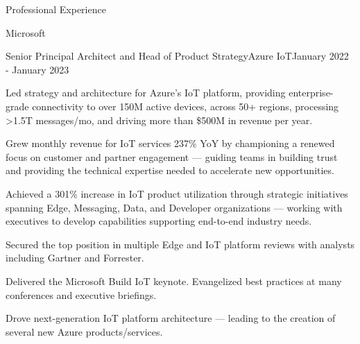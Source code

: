 \documentclass{resume} %
\begin{document}
\begin{rSection}{Professional Experience}
  \begin{rCompany}{Microsoft}{}{}

     \begin{rSubSubsection}{Senior Principal Architect and Head of Product Strategy}{Azure IoT}{January 2022 - January 2023}
        \item Led strategy and architecture for Azure's IoT platform, providing enterprise-grade connectivity to over 150M active devices, across 50+ regions, processing >1.5T messages/mo, and driving more than \$500M in revenue per year.
        \item Grew monthly revenue for IoT services 237\% YoY by championing a renewed focus on customer and partner engagement --- guiding teams in building trust and providing the technical expertise needed to accelerate new opportunities.
        \item Achieved a 301\% increase in IoT product utilization through strategic initiatives spanning Edge, Messaging, Data, and Developer organizations --- working with executives to develop capabilities supporting end-to-end industry needs.
        \item Secured the top position in multiple Edge and IoT platform reviews with analysts including Gartner and Forrester.
        \item Delivered the Microsoft Build IoT keynote. Evangelized best practices at many conferences and executive briefings.
        \item Drove next-generation IoT platform architecture --- leading to the creation of several new Azure products/services.
    
    \end{rSubSubsection}
    

\end{rCompany}
\end{rSection}
\end{document}
